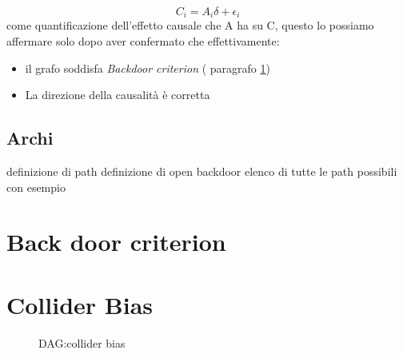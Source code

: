 \begin{equation}
C_i= A_i\delta + \epsilon_i
\end{equation}
come quantificazione dell'effetto causale che A ha su C, questo lo possiamo affermare solo dopo aver confermato che effettivamente:
\begin{itemize}
\item il grafo soddisfa \textit{Backdoor criterion} ( paragrafo \ref{sect:backdoor})
\item La direzione della causalità è corretta
\end{itemize}

\subsection{Archi}
definizione di path
definizione di open backdoor 
elenco di tutte le path possibili  con esempio




%

\section{Back door criterion}
\label{sect:backdoor}


\section{Collider Bias}
\begin{figure}[H]
\centering
\caption{DAG:collider bias}
\label{DAG:Colliderbias}
\end{figure} 

